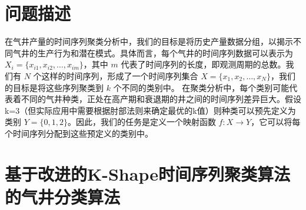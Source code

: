 \section{问题描述}
在气井产量的时间序列聚类分析中，我们的目标是将历史产量数据分组，以揭示不同气井的生产行为和潜在模式。具体而言，每个气井的时间序列数据可以表示为 \( X_i = \{x_{i1}, x_{i2}, \ldots, x_{im}\} \)，其中 \( m \) 代表了时间序列的长度，即观测周期的总数。我们有 \( N \) 个这样的时间序列，形成了一个时间序列集合 \( X = \{x_1, x_2, \ldots, x_N\} \)，我们的目标是将这些序列聚类到 \( k \) 个不同的类别中。
在聚类分析中，每个类别可能代表着不同的气井种类，正处在高产期和衰退期的井之间的时间序列差异巨大。假设k=3（但实际应用中需要根据肘部法则来确定最优的k值）则种类可以预先定义为类别 \( Y = \{0,1,2\} \)。因此，我们的任务是定义一个映射函数 \( f: X \to Y \)，它可以将每个时间序列分配到这些预定义的类别中。
\section{基于改进的K-Shape时间序列聚类算法的气井分类算法}

